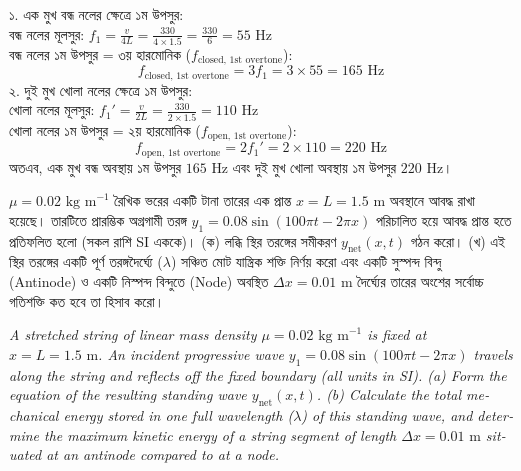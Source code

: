 \documentclass[12pt, a4paper]{article}
\begin{document}
\vspace{1em}

\begin{tcolorbox}[solutionbox={সমাধান (Solution)}]
\noindent
১. এক মুখ বন্ধ নলের ক্ষেত্রে ১ম উপসুর: \\
বন্ধ নলের মূলসুর: $f_1 = \frac{v}{4L} = \frac{330}{4 \times 1.5} = \frac{330}{6} = 55\text{ Hz}$ \\
বন্ধ নলের ১ম উপসুর = ৩য় হারমোনিক ($f_{\text{closed, 1st overtone}}$):
\[ f_{\text{closed, 1st overtone}} = 3 f_1 = 3 \times 55 = 165\text{ Hz} \]
২. দুই মুখ খোলা নলের ক্ষেত্রে ১ম উপসুর: \\
খোলা নলের মূলসুর: $f_1' = \frac{v}{2L} = \frac{330}{2 \times 1.5} = 110\text{ Hz}$ \\
খোলা নলের ১ম উপসুর = ২য় হারমোনিক ($f_{\text{open, 1st overtone}}$):
\[ f_{\text{open, 1st overtone}} = 2 f_1' = 2 \times 110 = 220\text{ Hz} \]
অতএব, এক মুখ বন্ধ অবস্থায় ১ম উপসুর $165\text{ Hz}$ এবং দুই মুখ খোলা অবস্থায় ১ম উপসুর $220\text{ Hz}$।
\end{tcolorbox}

\vspace{1.5em}
\begin{tcolorbox}[questionbox={প্রশ্ন (Question) 8}]
    \noindent
    $\mu = 0.02\text{ kg m}^{-1}$ রৈখিক ভরের একটি টানা তারের এক প্রান্ত $x = L = 1.5\text{ m}$ অবস্থানে আবদ্ধ রাখা হয়েছে। তারটিতে প্রারম্ভিক অগ্রগামী তরঙ্গ $y_1 = 0.08 \sin(100\pi t - 2\pi x)$ পরিচালিত হয়ে আবদ্ধ প্রান্ত হতে প্রতিফলিত হলো (সকল রাশি SI এককে)। 
    (ক) লব্ধি স্থির তরঙ্গের সমীকরণ $y_{\text{net}}(x,t)$ গঠন করো। 
    (খ) এই স্থির তরঙ্গের একটি পূর্ণ তরঙ্গদৈর্ঘ্যে ($\lambda$) সঞ্চিত মোট যান্ত্রিক শক্তি নির্ণয় করো এবং একটি সুস্পন্দ বিন্দু (Antinode) ও একটি নিস্পন্দ বিন্দুতে (Node) অবস্থিত $\Delta x = 0.01\text{ m}$ দৈর্ঘ্যের তারের অংশের সর্বোচ্চ গতিশক্তি কত হবে তা হিসাব করো।
    
    \vspace{0.8em}
    \begin{english}
    \noindent\textit{\color{darkgray}
    A stretched string of linear mass density $\mu = 0.02\text{ kg m}^{-1}$ is fixed at $x = L = 1.5\text{ m}$. An incident progressive wave $y_1 = 0.08 \sin(100\pi t - 2\pi x)$ travels along the string and reflects off the fixed boundary (all units in SI). (a) Form the equation of the resulting standing wave $y_{\text{net}}(x,t)$. (b) Calculate the total mechanical energy stored in one full wavelength ($\lambda$) of this standing wave, and determine the maximum kinetic energy of a string segment of length $\Delta x = 0.01\text{ m}$ situated at an antinode compared to at a node.
    }
    \end{english}
\end{tcolorbox}
\end{document}
